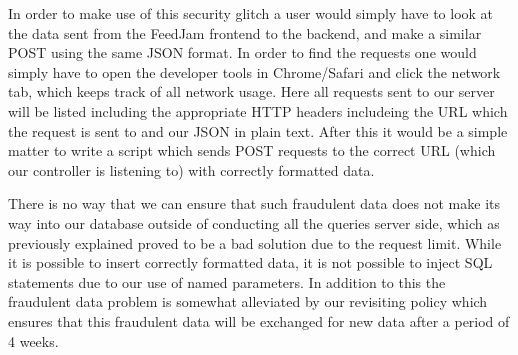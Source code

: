 In order to make use of this security glitch a user would simply have to look at the data sent from the FeedJam frontend to the backend, and make a similar POST using the same JSON format. In order to find the requests one would simply have to open the developer tools in Chrome/Safari and click the network tab, which keeps track of all network usage. Here all requests sent to our server will be listed including the appropriate HTTP headers includeing the URL which the request is sent to and our JSON in plain text. After this it would be a simple matter to write a script which sends POST requests to the correct URL (which our controller is listening to) with correctly formatted data.

There is no way that we can ensure that such fraudulent data does not make its way into our database outside of conducting all the queries server side, which as previously explained proved to be a bad solution due to the request limit. While it is possible to insert correctly formatted data, it is not possible to inject SQL statements due to our use of named parameters. In addition to this the fraudulent data problem is somewhat alleviated by our revisiting policy which ensures that this fraudulent data will be exchanged for new data after a period of 4 weeks.
